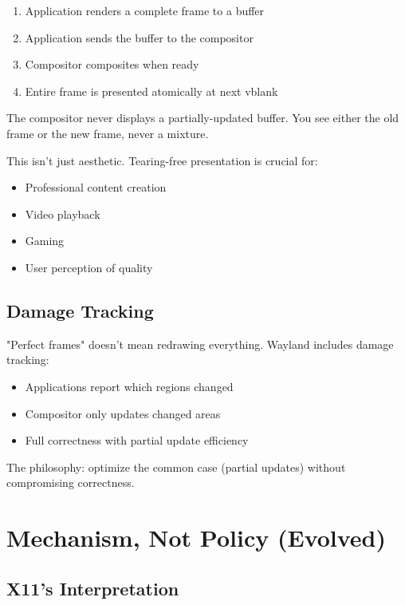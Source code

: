 \begin{enumerate}
    \item Application renders a complete frame to a buffer
    \item Application sends the buffer to the compositor
    \item Compositor composites when ready
    \item Entire frame is presented atomically at next vblank
\end{enumerate}

The compositor never displays a partially-updated buffer. You see either the old frame or the new frame, never a mixture.

\begin{notebox}
This isn't just aesthetic. Tearing-free presentation is crucial for:
\begin{itemize}
    \item Professional content creation
    \item Video playback
    \item Gaming
    \item User perception of quality
\end{itemize}
\end{notebox}

\subsection{Damage Tracking}

"Perfect frames" doesn't mean redrawing everything. Wayland includes damage tracking:

\begin{itemize}
    \item Applications report which regions changed
    \item Compositor only updates changed areas
    \item Full correctness with partial update efficiency
\end{itemize}

The philosophy: optimize the common case (partial updates) without compromising correctness.

\section{Mechanism, Not Policy (Evolved)}

\subsection{X11's Interpretation}

